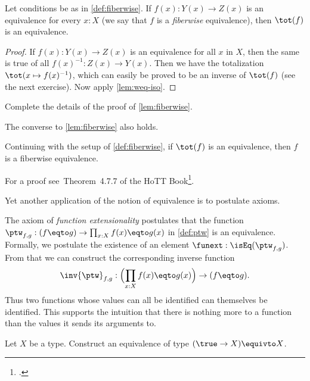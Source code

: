 \begin{lemma}\label{lem:fiberwise}
Let conditions be as in \cref{def:fiberwise}.
If $f(x): Y(x) \to Z(x)$ is an equivalence for every $x:X$
(we say that $f$ is a \emph{fiberwise} equivalence),
then $\tot(f)$ is an equivalence.
\end{lemma}
\begin{proof}
If $f(x): Y(x) \to Z(x)$ is an equivalence for all $x$ in $X$,
then the same is true of all $f(x)^{-1}: Z(x) \to Y(x)$.
Then we have the totalization $\tot(x\mapsto f(x)^{-1})$,
which can easily be proved to be an inverse of $\tot(f)$
(see the next exercise). Now apply \cref{lem:weq-iso}.
\end{proof}

\begin{xca}\label{xca:fiberwise}
Complete the details of the proof of \cref{lem:fiberwise}.
\end{xca}

The converse to \cref{lem:fiberwise} also holds.
\begin{lemma}\label{lem:fiberwise-equiv-from-tot}
  Continuing with the setup of \cref{def:fiberwise},
  if $\tot(f)$ is an equivalence, then $f$ is a fiberwise equivalence.
\end{lemma}
For a proof see~Theorem~4.7.7 of the HoTT Book\footcite{hottbook}.

Yet another application of the notion of equivalence is to postulate axioms.

\begin{principle}\label{def:funext}
The axiom of \emph{function extensionality} postulates that the function
$\ptw_{f,g}: (f \eqto g) \to \prod_{x:X} f(x) \eqto g(x)$ in \cref{def:ptw} is an equivalence.
Formally, we postulate the existence of an element $\funext : \isEq(\ptw_{f,g})$.
From that we can construct the corresponding inverse function
\[
\inv{\ptw}_{f,g}: \Bigl(\prod_{x:X} f(x) \eqto g(x)\Bigr) \to (f \eqto g).
\]
Thus two functions whose values can all be identified can themselves be identified.
This supports the intuition that there is nothing more to a function than the values
it sends its arguments to.
\end{principle}

\begin{xca}\label{xca:Xequiv1toX}
  Let $X$ be a type.  Construct an equivalence of type $( \true \to X ) \equivto X $.
\end{xca}


